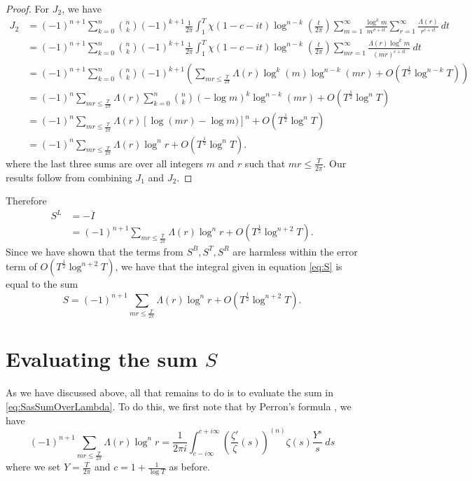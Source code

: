 \documentclass[12pt,a4paper,reqno]{amsart}
\theoremstyle{remark}
\numberwithin{equation}{section}
\begin{document}
\begin{proof}
For $J_2$, we have
\begin{align*}
J_2 &= (-1)^{n+1} \sum_{k=0}^n \binom{n}{k} (-1)^{k+1} \frac{1}{2 \pi } \int_{1}^{T} \chi (1 - c - it)  \log^{n-k} \left( \frac{t}{2 \pi} \right) \sum_{m=1}^{\infty} \frac{ \log^k m}{m^{\sigma + it}} \sum_{r=1}^{\infty} \frac{\Lambda (r)}{r^{c+it}} \ dt \\
&= (-1)^{n+1} \sum_{k=0}^n \binom{n}{k} (-1)^{k+1} \frac{1}{2 \pi } \int_{1}^{T} \chi (1 - c - it)  \log^{n-k} \left( \frac{t}{2 \pi} \right) \sum_{mr=1}^{\infty} \frac{ \Lambda (r) \log^k m }{(mr)^{c + it}} \ dt \\
&= (-1)^{n+1} \sum_{k=0}^n \binom{n}{k} (-1)^{k+1} \left( \sum_{m r \leq \frac{T}{2 \pi}} \Lambda (r) \log^k (m) \log^{n-k} (m r) + O(T^{\frac{1}{2}}\log^{n-k} T)\right)\\
&= (-1)^{n} \sum_{m r \leq \frac{T}{2 \pi}} \Lambda (r) \sum_{k=0}^n \binom{n}{k} (-\log m)^k \log^{n-k} (m r)  + O(T^{\frac{1}{2}}\log^{n} T) \\
&= (-1)^{n} \sum_{m r \leq \frac{T}{2 \pi}} \Lambda (r) [\log (m r) -\log m)]^n + O(T^{\frac{1}{2}}\log^{n} T)\\
&= (-1)^{n} \sum_{m r \leq \frac{T}{2 \pi}} \Lambda (r) \log ^n r + O(T^{\frac{1}{2}}\log^{n} T).
\end{align*}
where the last three sums are over all integers $m$ and $r$ such that $mr \leq \frac{T}{2\pi}$. Our results follow from combining $J_1$ and $J_2$.
\end{proof}

Therefore
\begin{align*}
S^L &= - \overline{I} \\
&= (-1)^{n+1} \sum_{m r \leq \frac{T}{2 \pi}} \Lambda (r) \log ^n r + O(T^{\frac{1}{2}}\log^{n+2} T).
\end{align*}
Since we have shown that the terms from $S^B, S^T, S^R$ are harmless within the error term of $O(T^{\frac{1}{2}} \log^{n+2} T)$, we have that the integral given in equation \eqref{eq:S} is equal to the sum
\begin{equation}\label{eq:SasSumOverLambda}
S= (-1)^{n+1} \sum_{m r \leq \frac{T}{2 \pi}} \Lambda (r) \log ^n r + O(T^{\frac{1}{2}} \log^{n+2} T).
\end{equation}





\section{Evaluating the sum $S$}\label{sect:EvaluateS}
As we have discussed above, all that remains to do is to evaluate the sum in \eqref{eq:SasSumOverLambda}. To do this, we first note that by Perron's formula \cite[Ch. 5, Sect. 5.1]{MNT}, we have
\[
(-1)^{n+1} \sum_{m r \leq \frac{T}{2 \pi}} \Lambda (r) \log ^n r = \frac{1}{2 \pi i } \int_{c- i \infty}^{c + i \infty}\left( \frac{\zeta'}{\zeta}(s) \right)^{(n)} \zeta(s) \frac{Y^s}{s} \ ds
\]
where we set $Y=\frac{T}{2\pi}$ and $c=1 + \frac{1}{\log T}$ as before.
\end{document}
